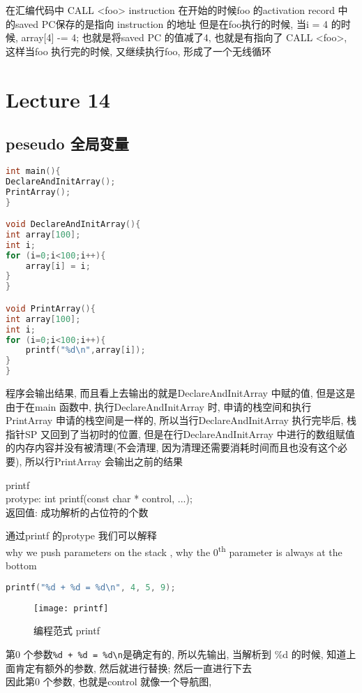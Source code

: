 \documentclass{article}
\begin{document}
在汇编代码中
CALL <foo>
instruction
在开始的时候foo 的activation record 中的saved PC保存的是指向 instruction 的地址
但是在foo执行的时候, 当i = 4 的时候, array[4] -= 4; 也就是将saved PC 的值减了4, 也就是有指向了 CALL <foo>, 这样当foo 执行完的时候, 又继续执行foo, 形成了一个无线循环

\section{Lecture 14}
\subsection{peseudo 全局变量}
\begin{lstlisting}[language = C]
int main(){
DeclareAndInitArray();
PrintArray();
}

void DeclareAndInitArray(){
int array[100];
int i;
for (i=0;i<100;i++){
	array[i] = i;
}
}

void PrintArray(){
int array[100];
int i;
for (i=0;i<100;i++){
	printf("%d\n",array[i]);
}
}
\end{lstlisting}
程序会输出结果, 而且看上去输出的就是DeclareAndInitArray 中赋的值, 但是这是由于在main 函数中, 执行DeclareAndInitArray 时, 申请的栈空间和执行PrintArray 申请的栈空间是一样的, 所以当行DeclareAndInitArray 执行完毕后, 栈指针SP 又回到了当初时的位置, 但是在行DeclareAndInitArray 中进行的数组赋值的内存内容并没有被清理(不会清理, 因为清理还需要消耗时间而且也没有这个必要), 所以行PrintArray 会输出之前的结果

printf\\
protype:	int printf(const char * control, ...);\\
返回值: 成功解析的占位符的个数

通过printf 的protype 我们可以解释\\
why we push parameters on the stack , why the $0$\textsuperscript{th} parameter is always at the bottom

\begin{lstlisting}[language = C]
printf("%d + %d = %d\n", 4, 5, 9);
\end{lstlisting}
\begin{figure}[htbp]
	\centering
	\texttt{[image: printf]}\\
	\caption{编程范式 printf}\label{fig.printf}
\end{figure}

第0 个参数\verb "%d + %
因此第0 个参数, 也就是control 就像一个导航图,
\end{document}
